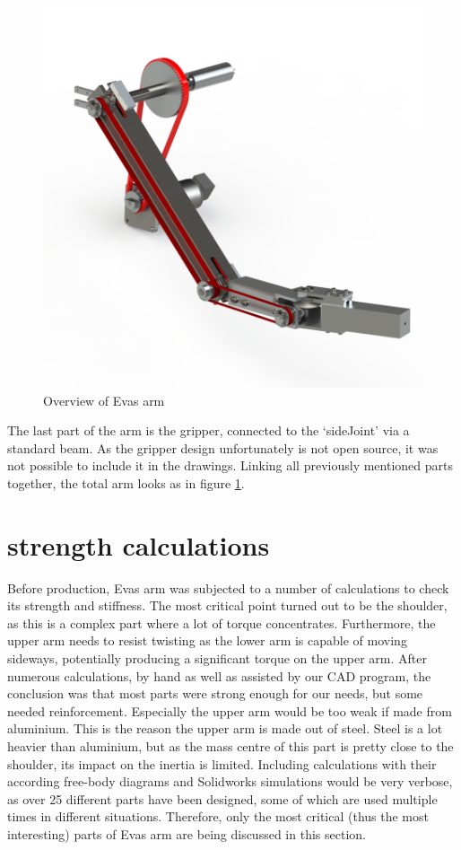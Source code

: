 \documentclass[technical_document.tex]{subfiles}
\begin{document}
\begin{figure}[ht!]
	\centering
	\mbox{\includegraphics[scale=1.0]{Images/overview.png}}
	\caption{Overview of Eva\textquotesingle{}s arm}
	\label{fig:overview}
\end{figure}

The last part of the  arm is the gripper, connected to the ‘sideJoint’ via a standard beam. As the gripper design unfortunately is not open source, it was not possible to include it in the drawings. Linking all previously mentioned parts together, the total arm looks as in figure \ref{fig:overview}.


\section{strength calculations}

Before production, Eva\textquotesingle{}s arm was subjected to a number of calculations to check its strength and stiffness. The most critical point turned out to be the shoulder, as this is a complex part where a lot of torque concentrates. Furthermore, the upper arm needs to resist twisting as the lower arm is capable of moving sideways, potentially producing a significant torque on the upper arm. After numerous calculations, by hand as well as assisted by our CAD program, the conclusion was that most parts were  strong enough for our needs, but some needed reinforcement. Especially the upper arm would be too weak if made from aluminium. This is the reason the upper arm is made out of steel. Steel is a lot heavier than aluminium, but as the mass centre of this part is pretty close to the shoulder, its impact on the inertia is limited.
Including calculations with their according free-body diagrams and Solidworks simulations would be very verbose, as over 25 different parts have been designed, some of which are used multiple times in different situations. Therefore, only the most critical (thus the most interesting) parts of Eva\textquotesingle{}s arm are being discussed in this section.
\end{document}
